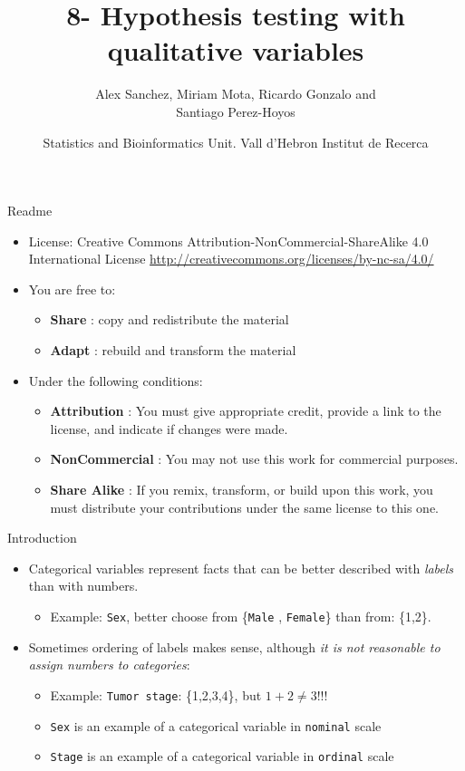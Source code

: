 \documentclass[
  ignorenonframetext,
]{beamer}
\title{8- Hypothesis testing with qualitative variables}
\author{Alex Sanchez, Miriam Mota, Ricardo Gonzalo and\\
Santiago Perez-Hoyos}
\date{Statistics and Bioinformatics Unit. Vall d'Hebron Institut de
Recerca}
\providecommand{\tightlist}{%
  \setlength{\itemsep}{0pt}\setlength{\parskip}{0pt}}
\begin{document}
\frame{\titlepage}

\begin{frame}
\begin{block}{Readme}
\protect\hypertarget{readme}{}
\begin{itemize}
\item
  License: Creative Commons Attribution-NonCommercial-ShareAlike 4.0
  International License
  \url{http://creativecommons.org/licenses/by-nc-sa/4.0/}
\item
  You are free to:

  \begin{itemize}
  \tightlist
  \item
    \textbf{Share} : copy and redistribute the material
  \item
    \textbf{Adapt} : rebuild and transform the material
  \end{itemize}
\item
  Under the following conditions:

  \begin{itemize}
  \tightlist
  \item
    \textbf{Attribution} : You must give appropriate credit, provide a
    link to the license, and indicate if changes were made.
  \item
    \textbf{NonCommercial} : You may not use this work for commercial
    purposes.
  \item
    \textbf{Share Alike} : If you remix, transform, or build upon this
    work, you must distribute your contributions under the same license
    to this one.
  \end{itemize}
\end{itemize}
\end{block}
\end{frame}

\begin{frame}[fragile]{Introduction}
\protect\hypertarget{introduction}{}
\begin{itemize}
\item
  Categorical variables represent facts that can be better described
  with \emph{labels} than with numbers.

  \begin{itemize}
  \tightlist
  \item
    Example: \texttt{Sex}, better choose from \{\texttt{Male} ,
    \texttt{Female}\} than from: \{1,2\}.
  \end{itemize}
\item
  Sometimes ordering of labels makes sense, although \emph{it is not
  reasonable to assign numbers to categories}:

  \begin{itemize}
  \item
    Example: \texttt{Tumor\ stage}: \{1,2,3,4\}, but \(1+2\neq 3\)!!!
  \item
    \texttt{Sex} is an example of a categorical variable in
    \texttt{nominal} scale
  \item
    \texttt{Stage} is an example of a categorical variable in
    \texttt{ordinal} scale
  \end{itemize}
\end{itemize}
\end{frame}
\end{document}
